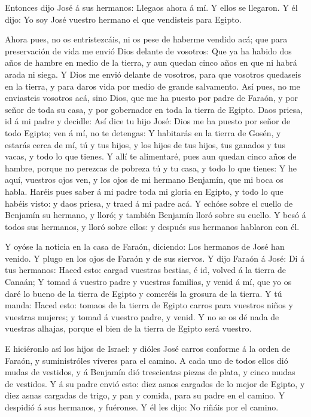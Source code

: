  Entonces dijo José á sus hermanos: Llegaos ahora á mí. Y
ellos se llegaron. Y él dijo: Yo soy José vuestro hermano el que
vendisteis para Egipto.

 Ahora pues, no os entristezcáis, ni os pese de haberme
vendido acá; que para preservación de vida me envió Dios delante de
vosotros:  Que ya ha habido dos años de hambre en medio de
la tierra, y aun quedan cinco años en que ni habrá arada ni siega.
 Y Dios me envió delante de vosotros, para que vosotros
quedaseis en la tierra, y para daros vida por medio de grande
salvamento.  Así pues, no me enviasteis vosotros acá, sino
Dios, que me ha puesto por padre de Faraón, y por señor de toda su casa,
y por gobernador en toda la tierra de Egipto.  Daos priesa,
id á mi padre y decidle: Así dice tu hijo José: Dios me ha puesto por
señor de todo Egipto; ven á mí, no te detengas:  Y
habitarás en la tierra de Gosén, y estarás cerca de mí, tú y tus hijos,
y los hijos de tus hijos, tus ganados y tus vacas, y todo lo que tienes.
 Y allí te alimentaré, pues aun quedan cinco años de
hambre, porque no perezcas de pobreza tú y tu casa, y todo lo que
tienes:  Y he aquí, vuestros ojos ven, y los ojos de mi
hermano Benjamín, que mi boca os habla.  Haréis pues saber
á mi padre toda mi gloria en Egipto, y todo lo que habéis visto: y daos
priesa, y traed á mi padre acá.  Y echóse sobre el cuello
de Benjamín su hermano, y lloró; y también Benjamín lloró sobre su
cuello.  Y besó á todos sus hermanos, y lloró sobre ellos:
y después sus hermanos hablaron con él.

 Y oyóse la noticia en la casa de Faraón, diciendo: Los
hermanos de José han venido. Y plugo en los ojos de Faraón y de sus
siervos.  Y dijo Faraón á José: Di á tus hermanos: Haced
esto: cargad vuestras bestias, é id, volved á la tierra de Canaán;
 Y tomad á vuestro padre y vuestras familias, y venid á mí,
que yo os daré lo bueno de la tierra de Egipto y comeréis la grosura de
la tierra.  Y tú manda: Haced esto: tomaos de la tierra de
Egipto carros para vuestros niños y vuestras mujeres; y tomad á vuestro
padre, y venid.  Y no se os dé nada de vuestras alhajas,
porque el bien de la tierra de Egipto será vuestro.

 E hiciéronlo así los hijos de Israel: y dióles José carros
conforme á la orden de Faraón, y suministróles víveres para el camino.
 A cada uno de todos ellos dió mudas de vestidos, y á
Benjamín dió trescientas piezas de plata, y cinco mudas de vestidos.
 Y á su padre envió esto: diez asnos cargados de lo mejor
de Egipto, y diez asnas cargadas de trigo, y pan y comida, para su padre
en el camino.  Y despidió á sus hermanos, y fuéronse. Y él
les dijo: No riñáis por el camino.

